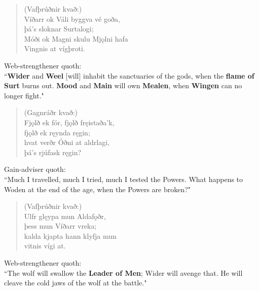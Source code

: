 \begin{verse}
(Vafþrúðnir kvað:) \\%
\bva Víðarr ok Váli \hld byggva vé goða, \\%
\ind þá's sloknar Surtalogi; \\%
Móði ok Magni \hld skulu Mjǫlni hafa \\%
\ind Vingnis at vígþroti.\\%
\end{verse}

\bvb Web-strengthener quoth: \\ “\textbf{Wider} and \textbf{Weel} [will] inhabit the sanctuaries of the gods, when the \textbf{flame of Surt} burns out. \textbf{Mood} and \textbf{Main} will own \textbf{Mealen}, when \textbf{Wingen} can no longer fight\footnotemark[110]." \\

\begin{verse}
(Gagnráðr kvað:) \\%
\bva Fjǫlð ek fór, \hld fjǫlð fręistaða'k, \\%
\ind fjǫlð ek ręynda ręgin; \\%
hvat verðr Óðni \hld at aldrlagi, \\%
\ind þá's rjúfask ręgin?\\%
\end{verse}

\bvb Gain-adviser quoth: \\ “Much I travelled, much I tried, much I tested the Powers. What happens to Woden at the end of the age, when the Powers are broken?" \\

\begin{verse}
(Vafþrúðnir kvað:) \\%
\bva Ulfr glęypa \hld mun Aldafǫðr, \\%
\ind þess mun Víðarr vreka; \\%
kalda kjapta \hld hann klyfja mun \\%
\ind vitnis vígi at.\\%
\end{verse}

\bvb Web-strengthener quoth: \\ “The wolf will swallow the \textbf{Leader of Men}; Wider will avenge that. He will cleave the cold jaws of the wolf at the battle." \\

